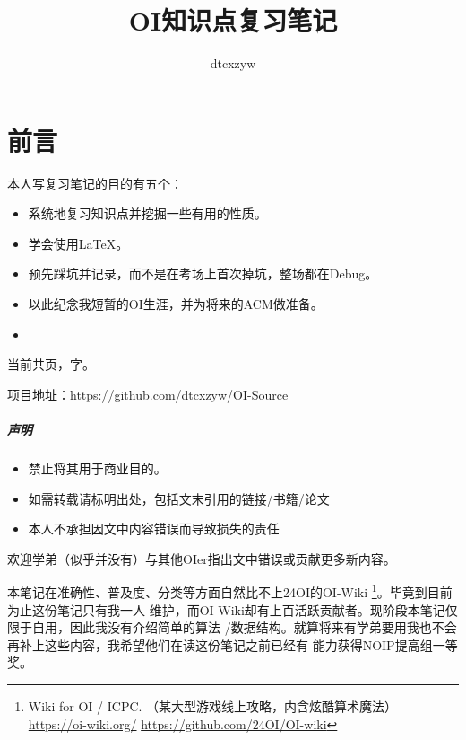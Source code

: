 \documentclass[10pt,b5paper,openany]{book}
\begin{document}

\title{OI知识点复习笔记}
\author{dtcxzyw}
\frontmatter
\maketitle
\chapter{前言}
本人写复习笔记的目的有五个：
\begin{itemize}
	\item 系统地复习知识点并挖掘一些有用的性质。
	\item 学会使用\LaTeX{}。
	\item 预先踩坑并记录，而不是在考场上首次掉坑，整场都在Debug。
	\item 以此纪念我短暂的OI生涯，并为将来的ACM做准备。
	\item {}
\end{itemize}

当前共\pageref{LastPage}页，字。

项目地址：\url{https://github.com/dtcxzyw/OI-Source}

\paragraph{声明}
{\bfseries
\begin{itemize}
    \item 禁止将其用于商业目的。
    \item 如需转载请标明出处，包括文末引用的链接/书籍/论文
    \item 本人不承担因文中内容错误而导致损失的责任
\end{itemize}
}

欢迎学弟（似乎并没有）与其他OIer指出文中错误或贡献更多新内容。

本笔记在准确性、普及度、分类等方面自然比不上24OI的OI-Wiki
\footnote{Wiki for OI / ICPC. （某大型游戏线上攻略，内含炫酷算术魔法）
\url{https://oi-wiki.org/}
\url{https://github.com/24OI/OI-wiki}}。毕竟到目前为止这份笔记只有我一人
维护，而OI-Wiki却有上百活跃贡献者。现阶段本笔记仅限于自用，因此我没有介绍简单的算法
/数据结构。就算将来有学弟要用我也不会再补上这些内容，我希望他们在读这份笔记之前已经有
能力获得NOIP提高组一等奖。

\renewcommand\contentsname{目录}
\tableofcontents
\mainmatter
\adjustmtc



















\appendix

\printindex

\backmatter

\end{document}
